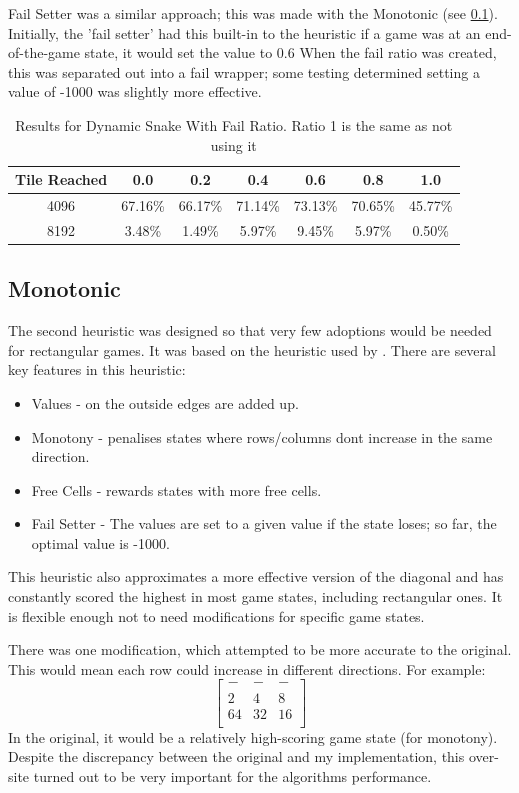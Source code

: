 \documentclass{article}
\begin{document}
Fail Setter was a similar approach; this was made with the Monotonic  (see \ref{subsec:mono}). Initially, the 'fail setter' had this built-in to the heuristic if a game was at an end-of-the-game state, it would set the value to 0.6 When the fail ratio was created, this was separated out into a fail wrapper; some testing determined setting a value of -1000 was slightly more effective. 
\begin{table}
    \centering
\begin{tabular}{|c|c c c c c c|}
    \hline
    Tile Reached & 0.0 & 0.2 & 0.4 & 0.6 & 0.8 & 1.0  \\
    \hline
     4096 & 67.16\%&66.17\%&71.14\%&73.13\%&70.65\%&45.77\%\\
     8192 &3.48\%&1.49\%&5.97\%&9.45\%&5.97\%&0.50\%\\
     \hline
\end{tabular}
    \caption{Results for Dynamic Snake With Fail Ratio. Ratio 1 is the same as not using it}
    \label{tab:dsfail}
\end{table}

\subsection{Monotonic}
\label{subsec:mono}
The second heuristic was designed so that very few adoptions would be needed for rectangular games. It was based on the heuristic used by \cite{_16k2048ai}. There are several key features in this heuristic:
\begin{itemize}
    \item Values - on the outside edges are added up.
    \item Monotony - penalises states where rows/columns don\textquotesingle t increase in the same direction.
    \item Free Cells - rewards states with more free cells.
    \item Fail Setter - The values are set to a given value if the state loses; so far, the optimal value is -1000.
\end{itemize}
This heuristic also approximates a more effective version of the diagonal and has constantly scored the highest in most game states, including rectangular ones. It is flexible enough not to need modifications for specific game states.

There was one modification, which attempted to be more accurate to the original. This would mean each row could increase in different directions. For example:
\[
\begin{bmatrix}
    -&-&-\\
    2&4&8\\
    64&32&16\\
\end{bmatrix}
\]
In the original, it would be a relatively high-scoring game state (for monotony).
Despite the discrepancy between the original and my implementation, this over-site
turned out to be very important for the algorithm\textquotesingle s performance.
\end{document}
